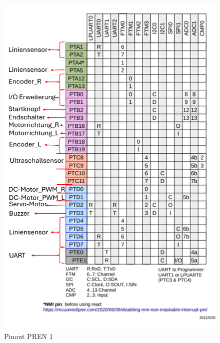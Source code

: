\begin{figure}[H]
\centering
\begin{minipage}[b]{0.45\textwidth}
  \centering
  \includegraphics[width=\textwidth]{assets/ET/PINOUT/Pinout_PREN1.png}
  \caption{Pinout PREN 1}
  \label{fig:Pinout PREN 1}
\end{minipage}
\hspace{0.05\textwidth} %
\begin{minipage}[b]{0.45\textwidth}
  \centering

\end{minipage}
\end{figure}
